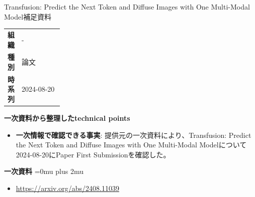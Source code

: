 \begin{technicalnote}{Transfusion: Predict the Next Token and Diffuse Images with One Multi-Modal Model}{補足資料}
\begingroup
\begin{tabularx}{\linewidth}{@{}>{\bfseries}p{0.22\linewidth}X@{}}
組織 & - \\
種別 & 論文 \\
時系列 & 2024-08-20 \\
\end{tabularx}
\smallskip
{\bfseries 一次資料から整理したtechnical points}
\begin{itemize}[leftmargin=1.5em,itemsep=0.35em]
\item \textbf{一次情報で確認できる事実}: 提供元の一次資料により、Transfusion: Predict the Next Token and Diffuse Images with One Multi-Modal Modelについて2024-08-20にPaper First Submissionを確認した。
\end{itemize}
\begin{minipage}{\linewidth}
\begin{samepage}
{\bfseries 一次資料}
\begingroup\sloppy
\Urlmuskip=0mu plus 2mu\relax
\begin{itemize}[leftmargin=1.5em,itemsep=0.25em]
\item {\scriptsize\url{https://arxiv.org/abs/2408.11039}}
\end{itemize}
\endgroup
\end{samepage}
\end{minipage}
\endgroup
\end{technicalnote}
\medskip


